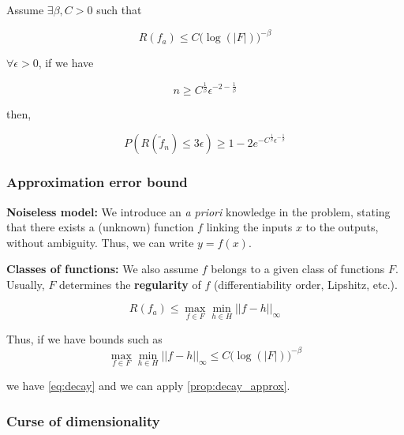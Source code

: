 \documentclass[
10pt, %
a4paper, %
oneside, %
headinclude,footinclude, %
BCOR5mm, %
]{scrartcl}
\begin{document}
    \begin{proposition}
	\label{prop:decay_approx}

	Assume $\exists \beta , C >0$ such that

	\begin{equation}
	    \label{eq:decay}
	    R(f_a)\leq C\big( \log(|F|) \big)^{-\beta}
	\end{equation}

	$\forall \epsilon >0$, if we have

	\begin{equation*}
	    n\geq C^{ \frac{1}{ \beta} } \epsilon^{-2- \frac{1}{\beta} }
	\end{equation*}

	then,

	\begin{equation*}
	    P(R( \tilde{f}_n)\leq 3\epsilon)\geq 1-2e^{ - C^{ \frac{1}{\beta} }\epsilon^{- \frac{1}{\beta} }}
	\end{equation*}
        
    \end{proposition}

    \subsubsection{\large\color{Periwinkle}Approximation error bound}

    \textbf{{Noiseless model:}} We introduce an \textit{{a priori}} knowledge in the problem, stating that there exists a (unknown) function $f$ linking the inputs $x$ to the outputs, without ambiguity. Thus, we can write $y=f(x)$.

    \textbf{{Classes of functions:}} We also assume $f$ belongs to a given class of functions $F$. Usually, $F$ determines the \textbf{{regularity }} of $f$ (differentiability order, Lipshitz, etc.).

    \begin{equation*}
	R(f_a)\leq \max_{f\in F}\min_{h\in H}||f-h||_{\infty}
    \end{equation*}

    Thus, if we have bounds such as
    \begin{equation}
	\label{eq:unif_bound}
\max_{f\in F}\min_{h\in H}||f-h||_{\infty}\leq C\big( \log(|F|) \big)^{-\beta}  
    \end{equation}

    we have \ref{eq:decay} and we can apply \ref{prop:decay_approx}.

    \subsubsection{\large\color{Periwinkle}Curse of dimensionality}
\end{document}
